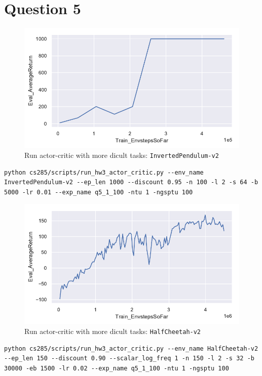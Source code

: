 \documentclass[letterpaper, 10pt]{article}
\begin{document}
\newpage

\section{Question 5}
\begin{figure}[h]
\centering
\includegraphics{figures/q5_inverted_pendulum.pdf}
\caption{Run actor-critic with more dicult tasks: \texttt{InvertedPendulum-v2}}
\end{figure}

\begin{lstlisting}[caption=Exact command line configurations]
python cs285/scripts/run_hw3_actor_critic.py --env_name InvertedPendulum-v2 --ep_len 1000 --discount 0.95 -n 100 -l 2 -s 64 -b 5000 -lr 0.01 --exp_name q5_1_100 -ntu 1 -ngsptu 100
\end{lstlisting}

\begin{figure}[h]
\centering
\includegraphics{figures/q5_half_cheetah.pdf}
\caption{Run actor-critic with more dicult tasks: \texttt{HalfCheetah-v2}}
\end{figure}

\begin{lstlisting}[caption=Exact command line configurations]
python cs285/scripts/run_hw3_actor_critic.py --env_name HalfCheetah-v2 --ep_len 150 --discount 0.90 --scalar_log_freq 1 -n 150 -l 2 -s 32 -b 30000 -eb 1500 -lr 0.02 --exp_name q5_1_100 -ntu 1 -ngsptu 100
\end{lstlisting}
\end{document}
